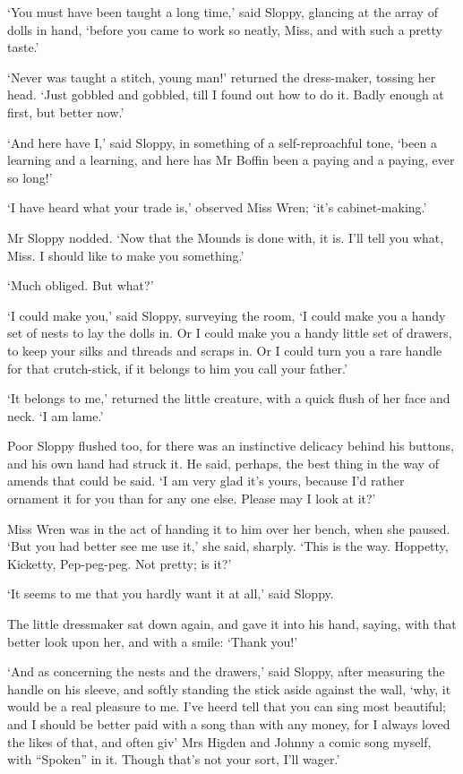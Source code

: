 ‘You must have been taught a long time,’ said Sloppy, glancing at the
array of dolls in hand, ‘before you came to work so neatly, Miss, and
with such a pretty taste.’

‘Never was taught a stitch, young man!’ returned the dress-maker,
tossing her head. ‘Just gobbled and gobbled, till I found out how to do
it. Badly enough at first, but better now.’

‘And here have I,’ said Sloppy, in something of a self-reproachful tone,
‘been a learning and a learning, and here has Mr Boffin been a paying
and a paying, ever so long!’

‘I have heard what your trade is,’ observed Miss Wren; ‘it’s
cabinet-making.’

Mr Sloppy nodded. ‘Now that the Mounds is done with, it is. I’ll tell
you what, Miss. I should like to make you something.’

‘Much obliged. But what?’

‘I could make you,’ said Sloppy, surveying the room, ‘I could make you
a handy set of nests to lay the dolls in. Or I could make you a handy
little set of drawers, to keep your silks and threads and scraps in. Or
I could turn you a rare handle for that crutch-stick, if it belongs to
him you call your father.’

‘It belongs to me,’ returned the little creature, with a quick flush of
her face and neck. ‘I am lame.’

Poor Sloppy flushed too, for there was an instinctive delicacy behind
his buttons, and his own hand had struck it. He said, perhaps, the best
thing in the way of amends that could be said. ‘I am very glad it’s
yours, because I’d rather ornament it for you than for any one else.
Please may I look at it?’

Miss Wren was in the act of handing it to him over her bench, when she
paused. ‘But you had better see me use it,’ she said, sharply. ‘This is
the way. Hoppetty, Kicketty, Pep-peg-peg. Not pretty; is it?’

‘It seems to me that you hardly want it at all,’ said Sloppy.

The little dressmaker sat down again, and gave it into his hand, saying,
with that better look upon her, and with a smile: ‘Thank you!’

‘And as concerning the nests and the drawers,’ said Sloppy, after
measuring the handle on his sleeve, and softly standing the stick aside
against the wall, ‘why, it would be a real pleasure to me. I’ve heerd
tell that you can sing most beautiful; and I should be better paid with
a song than with any money, for I always loved the likes of that, and
often giv’ Mrs Higden and Johnny a comic song myself, with “Spoken” in
it. Though that’s not your sort, I’ll wager.’

